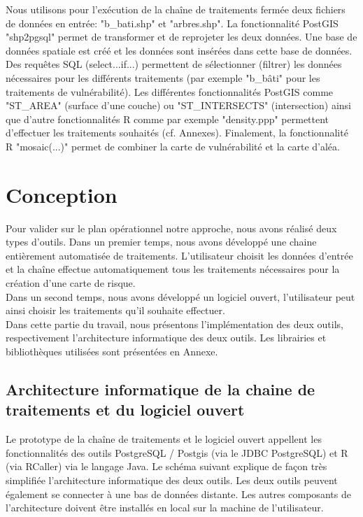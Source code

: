 Nous utilisons pour l'exécution de la chaîne de traitements fermée deux fichiers de données en entrée: "b\_bati.shp" et "arbres.shp". La fonctionnalité PostGIS "shp2pgsql" permet de transformer et de reprojeter les deux données. Une base de données spatiale est créé et les données sont insérées dans cette base de données. Des requêtes SQL (select...if...) permettent de sélectionner (filtrer) les données nécessaires pour les différents traitements (par exemple "b\_bâti" pour les traitements de vulnérabilité). Les différentes fonctionnalités PostGIS comme "ST\_AREA" (surface d'une couche) ou "ST\_INTERSECTS" (intersection) ainsi que d'autre fonctionnalités R comme par exemple "density.ppp" permettent d'effectuer les traitements souhaités (cf. Annexes). Finalement, la fonctionnalité R "mosaic(...)" permet de combiner la carte de vulnérabilité et la carte d'aléa. 

\section{Conception}

Pour valider sur le plan opérationnel notre approche, nous avons réalisé deux types d'outils. Dans un premier temps, nous avons développé une chaine entièrement automatisée de traitements. L'utilisateur choisit les données d'entrée et la chaîne effectue automatiquement tous les traitements nécessaires pour la création d'une carte de risque. \\

Dans un second temps, nous avons développé un logiciel ouvert, l'utilisateur peut ainsi choisir les traitements qu'il souhaite effectuer.\\

Dans cette partie du travail, nous présentons l'implémentation des deux outils, respectivement l'architecture informatique des deux outils. Les librairies et bibliothèques utilisées sont présentées en Annexe.


\subsection{Architecture informatique de la chaine de traitements et du logiciel ouvert}

Le prototype de la chaîne de traitements et le logiciel ouvert appellent les fonctionnalités des outils PostgreSQL / Postgis (via le JDBC PostgreSQL) et R (via RCaller) via le langage Java. Le schéma suivant explique de façon très simplifiée l'architecture informatique des deux outils. Les deux outils peuvent également se connecter à une bas de données distante. Les autres composants de l'architecture doivent être installés en local sur la machine de l'utilisateur.\\

